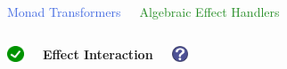 \documentclass[xcolor=pdftex,dvipsnames,table]{beamer}
\def\checkmark{\includegraphics[height=0.5cm]{checkmark}}
\def\questionmark{\includegraphics[height=0.5cm]{question_mark}}
\begin{document}
\begin{frame}
  \begin{columns}[c]
    \begin{center}
      \Large{\textcolor{RoyalBlue}{Monad Transformers}}
    \end{center}
    \begin{center}
      \Large{\textcolor{ForestGreen}{Algebraic Effect Handlers}}
    \end{center}
  \end{columns}
  \bigskip
  \bigskip
  \begin{columns}[c]
    \begin{center}
      \checkmark
    \end{center}
    \begin{center}
      \textbf{Effect Interaction}
    \end{center}
    \begin{center}
      \questionmark
    \end{center}
  \end{columns}
\end{frame}
\end{document}
